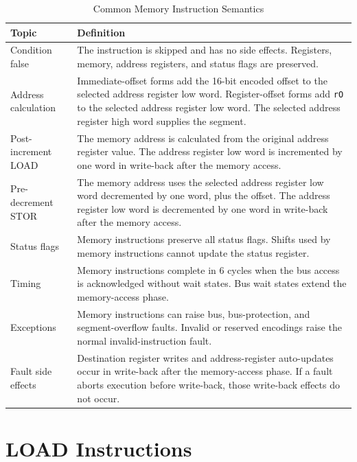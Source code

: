 \begin{table}[H]
	\centering
	\begin{tabular}{lp{9cm}}
		\toprule
		\textbf{Topic} & \textbf{Definition} \\
		\midrule
		Condition false & The instruction is skipped and has no side effects. Registers, memory, address registers, and status flags are preserved. \\
		Address calculation & Immediate-offset forms add the 16-bit encoded offset to the selected address register low word. Register-offset forms add \texttt{rO} to the selected address register low word. The selected address register high word supplies the segment. \\
		Post-increment LOAD & The memory address is calculated from the original address register value. The address register low word is incremented by one word in write-back after the memory access. \\
		Pre-decrement STOR & The memory address uses the selected address register low word decremented by one word, plus the offset. The address register low word is decremented by one word in write-back after the memory access. \\
		Status flags & Memory instructions preserve all status flags. Shifts used by memory instructions cannot update the status register. \\
		Timing & Memory instructions complete in 6 cycles when the bus access is acknowledged without wait states. Bus wait states extend the memory-access phase. \\
		Exceptions & Memory instructions can raise bus, bus-protection, and segment-overflow faults. Invalid or reserved encodings raise the normal invalid-instruction fault. \\
		Fault side effects & Destination register writes and address-register auto-updates occur in write-back after the memory-access phase. If a fault aborts execution before write-back, those write-back effects do not occur. \\
		\bottomrule
	\end{tabular}
	\caption{Common Memory Instruction Semantics}
	\label{tab:memory-common-semantics}
\end{table}

\section{LOAD Instructions}

